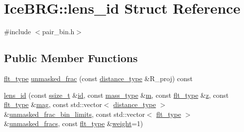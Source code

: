 \hypertarget{structIceBRG_1_1lens__id}{}\section{Ice\+B\+R\+G\+:\+:lens\+\_\+id Struct Reference}
\label{structIceBRG_1_1lens__id}


{\ttfamily \#include $<$pair\+\_\+bin.\+h$>$}

\subsection*{Public Member Functions}
\begin{DoxyCompactItemize}
\item 
\hyperlink{lib_2IceBRG__main_2common_8h_ad0f130a56eeb944d9ef2692ee881ecc4}{flt\+\_\+type} \hyperlink{structIceBRG_1_1lens__id_a2c6395fe4131dd780569fdcb14ad2767}{unmasked\+\_\+frac} (const \hyperlink{namespaceIceBRG_a45499647eb87e24c10ab32c628711cec}{distance\+\_\+type} \&R\+\_\+proj) const 
\item 
\hyperlink{structIceBRG_1_1lens__id_aae9828867a9d13f043820f9084661b00}{lens\+\_\+id} (const \hyperlink{lib_2IceBRG__main_2common_8h_ab322a3e50421dc5f0c43316b1b373592}{ssize\+\_\+t} \&\hyperlink{structIceBRG_1_1lens__id_afd7ce5f12f3675c0c63e2b741c177652}{id}, const \hyperlink{namespaceIceBRG_a1be72ac4918a9b029f2eefa084213e35}{mass\+\_\+type} \&\hyperlink{structIceBRG_1_1lens__id_af2551e9da4443bc56540c32dee75fbb5}{m}, const \hyperlink{lib_2IceBRG__main_2common_8h_ad0f130a56eeb944d9ef2692ee881ecc4}{flt\+\_\+type} \&\hyperlink{structIceBRG_1_1lens__id_aedfbb8478463687a0aa5982105a9f8fc}{z}, const \hyperlink{lib_2IceBRG__main_2common_8h_ad0f130a56eeb944d9ef2692ee881ecc4}{flt\+\_\+type} \&\hyperlink{structIceBRG_1_1lens__id_a9685ba64aac6b662881132968034d32a}{mag}, const std\+::vector$<$ \hyperlink{namespaceIceBRG_a45499647eb87e24c10ab32c628711cec}{distance\+\_\+type} $>$ \&\hyperlink{structIceBRG_1_1lens__id_a6a4f65e3e6e010a6d3ad0e27ba84ad9b}{unmasked\+\_\+frac\+\_\+bin\+\_\+limits}, const std\+::vector$<$ \hyperlink{lib_2IceBRG__main_2common_8h_ad0f130a56eeb944d9ef2692ee881ecc4}{flt\+\_\+type} $>$ \&\hyperlink{structIceBRG_1_1lens__id_a9a3d312cb37f480aa07d94e5a39d714b}{unmasked\+\_\+fracs}, const \hyperlink{lib_2IceBRG__main_2common_8h_ad0f130a56eeb944d9ef2692ee881ecc4}{flt\+\_\+type} \&\hyperlink{structIceBRG_1_1lens__id_ab1474c2d0c19469e6bb8c333b2123586}{weight}=1)
\end{DoxyCompactItemize}
